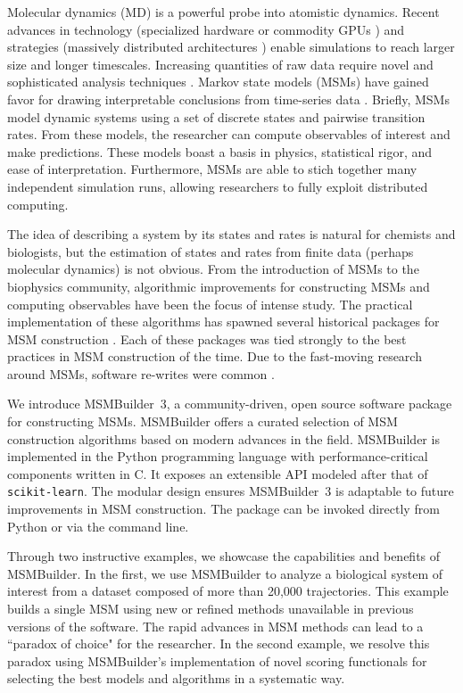 Molecular dynamics (MD) is a powerful probe into atomistic dynamics. Recent
advances in technology (specialized hardware \cite{2008-anton} or commodity
GPUs \cite{2009-friedrichs-gpu}) and strategies (massively distributed
architectures \cite{2000-fah, 2010-gpugrid, 2014-kohlhoff-exacycle}) enable
simulations to reach larger size and longer timescales. Increasing
quantities of raw data require novel and sophisticated analysis techniques
\cite{2014-msm-perspective}. Markov state models (MSMs) have gained favor
for drawing interpretable conclusions from time-series data
\cite{2010-everything-msm-afraid-ask, 2014-msm-perspective,
2014-chodera-msm, 2014-msm-book}. Briefly, MSMs model dynamic systems using
a set of discrete states and pairwise transition rates. From these models,
the researcher can compute observables of interest and make predictions.
These models boast a basis in physics, statistical rigor, and ease of
interpretation. Furthermore, MSMs are able to stich together many
independent simulation runs, allowing researchers to fully exploit
distributed computing.

The idea of describing a system by its states and rates is natural for
chemists and biologists, but the estimation of states and rates from finite
data (perhaps molecular dynamics) is not obvious. From the introduction of
MSMs to the biophysics community, algorithmic improvements for constructing
MSMs and computing observables have been the focus of intense study. The
practical implementation of these algorithms has spawned several historical
packages for MSM construction \cite{2009-msmbuilder1, 2011-msmbuilder2,
2012-jemma}. Each of these packages was tied strongly to the best
practices in MSM construction of the time. Due to the fast-moving research
around MSMs, software re-writes were common \cite{2015-pyemma, 2016-htmd}.

We introduce MSMBuilder~3, a community-driven, open source software package
for constructing MSMs. MSMBuilder offers a curated selection of MSM
construction algorithms based on modern advances in the field. MSMBuilder
is implemented in the Python programming language with performance-critical
components written in C. It exposes an extensible API modeled after that of
\texttt{scikit-learn}. The modular design ensures MSMBuilder~3 is adaptable
to future improvements in MSM construction. The package can be invoked
directly from Python or via the command line.

Through two instructive examples, we showcase the capabilities and benefits
of MSMBuilder. In the first, we use MSMBuilder to analyze a biological
system of interest from a dataset composed of more than 20,000
trajectories. This example builds a single MSM using new or refined methods
unavailable in previous versions of the software. The rapid advances in
MSM methods can lead to a ``paradox of choice" for the researcher. In the
second example, we resolve this paradox using MSMBuilder's implementation of novel scoring
functionals for selecting the best models and algorithms in a systematic
way.

